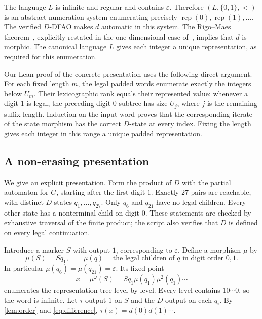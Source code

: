 \documentclass[11pt,a4paper]{article}
\numberwithin{equation}{section}
\theoremstyle{remark}
\newcommand{\eps}{\varepsilon}
\newcommand{\rep}{\operatorname{rep}}
\begin{document}
The language $L$ is infinite and regular and contains $\eps$. Therefore
$(L,\{0,1\},<)$ is an abstract numeration system enumerating precisely
$\rep(0),\rep(1),\ldots$. The verified $D$-DFAO makes $d$ automatic in
this system. The Rigo--Maes theorem~\cite{RM}, explicitly restated in the
one-dimensional case of~\cite[Theorem~24]{CKR}, implies that $d$ is morphic.
The canonical language $L$ gives each integer a unique representation,
as required for this enumeration.

Our Lean proof of the concrete presentation uses the following direct
argument. For each fixed
length $m$, the legal padded words enumerate exactly the integers below $U_m$.
Their lexicographic rank equals their represented value: whenever a digit
$1$ is legal, the preceding digit-$0$ subtree has size $U_j$, where $j$ is
the remaining suffix length. Induction on the input word proves that the
corresponding iterate of the state morphism has the correct $D$-state at
every index. Fixing the length gives each integer in this range a unique
padded representation.

\subsection{A non-erasing presentation}
We give an explicit presentation. Form the product of $D$ with the partial
automaton for $G$, starting after the first digit $1$. Exactly $27$ pairs
are reachable, with distinct $D$-states $q_1,\ldots,q_{27}$.
Only $q_6$ and $q_{21}$ have no legal children. Every other state has a
nonterminal child on digit $0$. These statements are checked by exhaustive
traversal of the finite product; the script also verifies that $D$ is
defined on every legal continuation.

Introduce a marker $S$ with output $1$, corresponding to $\eps$. Define a
morphism $\mu$ by
\[
 \mu(S)=S q_1,\qquad
 \mu(q)=\text{the legal children of $q$ in digit order $0,1$}.
\]
In particular $\mu(q_6)=\mu(q_{21})=\eps$. Its fixed point
\[
 x=\mu^\omega(S)=S q_1\mu(q_1)\mu^2(q_1)\cdots
\]
enumerates the representation tree level by level. Every level contains
$10\cdots0$, so the word is infinite. Let $\tau$ output $1$ on $S$ and
the $D$-output on each $q_i$. By \cref{lem:order} and
\eqref{eq:difference}, $\tau(x)=d(0)d(1)\cdots$.
\end{document}
